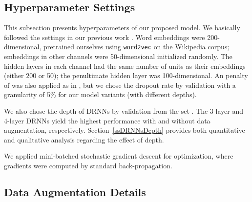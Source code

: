 \documentclass[11pt]{article}
\begin{document}
\subsection{Hyperparameter Settings}\label{ssSetting}



This subsection presents hyperparameters of our proposed model.
We basically followed the settings in our previous work \cite{SDP-LSTM}.
Word embeddings were 200-dimensional, pretrained ourselves using {\tt word2vec} \cite{Word2vce} on the Wikipedia corpus; embeddings in other channels were 50-dimensional initialized randomly.
The hidden layers in each channel had the same number of units as their embeddings (either 200 or 50); the penultimate hidden layer was 100-dimensional. An  penalty of   was also applied as in , but we chose the dropout rate by validation with a granularity of 5\% for our model variants (with different depths).


We also chose the depth of DRNNs by validation from the set . The 3-layer and  4-layer DRNNs yield the highest performance with and without data augmentation, respectively. Section~\ref{ssDRNNsDepth} provides both quantitative and qualitative analysis regarding the effect of depth.


We applied mini-batched stochastic gradient descent for optimization, where gradients were computed by standard back-propagation.

\subsection{Data Augmentation Details}\label{ssExpDataAug}
\end{document}
